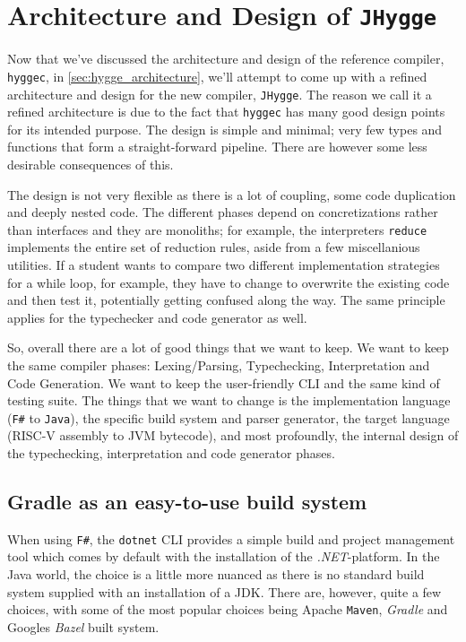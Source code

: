 \chapter{Architecture and Design of \texttt{JHygge}}\label{sec:architecture}

Now that we've discussed the architecture and design of the reference compiler, \texttt{hyggec}, in \ref{sec:hygge_architecture}, we'll attempt to come up with
a refined architecture and design for the new compiler, \texttt{JHygge}. The reason we call it a refined architecture is due to
the fact that \texttt{hyggec} has many good design points for its intended purpose. The design is simple and minimal; very
few types and functions that form a straight-forward pipeline. There are however some less desirable consequences of this.

The design is not very flexible as there is a lot of coupling, some code duplication and deeply nested code. The different
phases depend on concretizations rather than interfaces and they are monoliths; for example, the interpreters \texttt{reduce}
implements the entire set of reduction rules, aside from a few miscellanious utilities. If a student wants to compare two different
implementation strategies for a while loop, for example, they have to change to overwrite the existing code and then test it,
potentially getting confused along the way. The same principle applies for the typechecker and code generator as well.

So, overall there are a lot of good things that we want to keep. We want to keep the same compiler phases: Lexing/Parsing, Typechecking,
Interpretation and Code Generation. We want to keep the user-friendly CLI and the same kind of testing suite. The things that we
want to change is the implementation language (\texttt{F\#} to \texttt{Java}), the specific build system and parser generator,
the target language (RISC-V assembly to JVM bytecode), and most profoundly, the internal design of the typechecking, interpretation
and code generator phases.

\section{Gradle as an easy-to-use build system}

When using \texttt{F\#}, the \texttt{dotnet} CLI provides a simple build and project management tool which comes by default
with the installation of the \textit{.NET}-platform. In the Java world, the choice is a little more nuanced as there is
no standard build system supplied with an installation of a JDK. There are, however, quite a few choices, with some of the
most popular choices being Apache \texttt{Maven}\cite{maven}, \textit{Gradle}\cite{Gradle} and Googles \textit{Bazel}\cite{bazel} built system.

